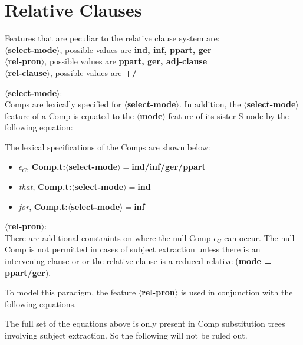 \section{Relative Clauses}
Features that are peculiar to the relative clause system are:\\
{\bf $\langle$select-mode$\rangle$}, possible values are {\bf ind, inf, ppart, ger}\\
{\bf $\langle$rel-pron$\rangle$}, possible values are {\bf ppart, ger, adj-clause}\\
{\bf $\langle$rel-clause$\rangle$}, possible values are {\bf +/--}

\noindent
{\bf $\langle$select-mode$\rangle$}:\\
Comps are lexically specified for {\bf $\langle$select-mode$\rangle$}.
In addition, the {\bf $\langle$select-mode$\rangle$} feature of a Comp
is equated to the {\bf $\langle$mode$\rangle$} feature of its
sister S node by the following equation:


The lexical specifications of the Comps are shown below:
\begin{itemize}
\item $\epsilon$$_{C}$, {\bf Comp.t:$\langle$select-mode$\rangle
=$ind/inf/ger/ppart}
\item {\em that}, {\bf Comp.t:$\langle$select-mode$\rangle =$ind}
\item {\em for}, {\bf Comp.t:$\langle$select-mode$\rangle =$inf}
\end{itemize}

\noindent
{\bf $\langle$rel-pron$\rangle$}:\\
There are additional constraints on where the null Comp $\epsilon$$_{C}$
can occur. The null Comp is not permitted in cases of subject
extraction unless there is an intervening clause or or
the relative clause is a reduced relative ({\bf mode = ppart/ger}).

To model this paradigm, the feature {\bf $\langle$rel-pron$\rangle$} is used in
conjunction with the following equations.



The full set of the equations above is only present in Comp
substitution trees involving subject extraction. So the following will
not be ruled out.

